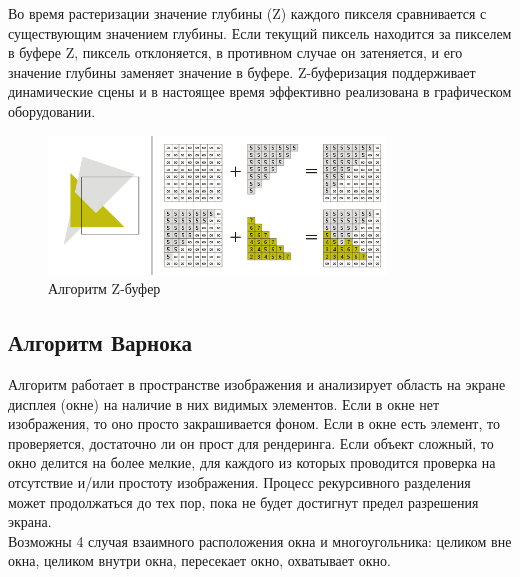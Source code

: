 Во время растеризации значение глубины (Z) каждого пикселя сравнивается с существующим значением глубины. Если текущий пиксель находится за пикселем в буфере Z, пиксель отклоняется, в противном случае он затеняется, и его значение глубины заменяет значение в буфере. Z-буферизация поддерживает динамические сцены и в настоящее время эффективно реализована в графическом оборудовании.
\\
\begin{figure}[ht]
  \centering
  \includegraphics[width=0.8\textwidth]{img/zbuffer.png}
  \caption{Алгоритм Z-буфер}
\end{figure}




\subsection*{Алгоритм Варнока}


Алгоритм работает в пространстве изображения и анализирует область на экране дисплея (окне) на наличие в них видимых элементов. Если в окне нет изображения, то оно просто закрашивается фоном. Если в окне есть элемент, то проверяется, достаточно ли он прост для рендеринга. Если объект сложный, то окно делится на более мелкие, для каждого из которых проводится проверка на отсутствие и/или простоту изображения. Процесс рекурсивного разделения может продолжаться до тех пор, пока не будет достигнут предел разрешения экрана.
\\

Возможны 4 случая взаимного расположения окна и многоугольника:
целиком вне окна, целиком внутри окна, пересекает окно, охватывает окно.



